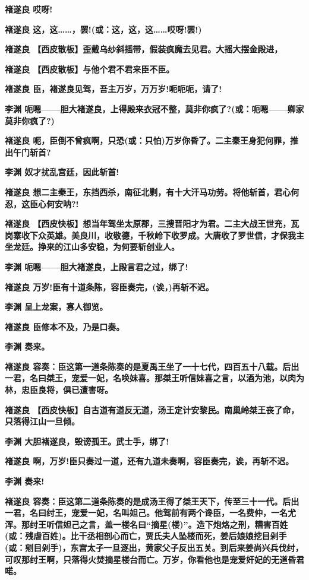 \textbf{褚遂良 哎呀!}

\textbf{褚遂良
这，这\ldots{}\ldots{}，罢!(或：这，这，这\ldots{}\ldots{}哎呀!罢!)}

\textbf{褚遂良
【西皮散板】歪戴乌纱斜插带，假装疯魔去见君。大摇大摆金殿进，}

\textbf{褚遂良 【西皮散板】与他个君不君来臣不臣。}

\textbf{褚遂良 臣，褚遂良见驾，吾主万岁，万万岁!呃呃呃，请了!}

\textbf{李渊
呃嗯------胆大褚遂良，上得殿来衣冠不整，莫非你疯了?(或：呃嗯------卿家莫非你疯了?)}

\textbf{褚遂良
呃，臣倒不曾疯啊，只恐(或：只怕)万岁你昏了。二主秦王身犯何罪，推出午门斩首?}

\textbf{李渊 奴才扰乱宫廷，因此斩首!}

\textbf{褚遂良
想二主秦王，东挡西杀，南征北剿，有十大汗马功劳。将他斩首，君心何忍，这臣心何安呐?!}

\textbf{褚遂良
【西皮快板】想当年驾坐太原郡，三搜晋阳才为君。二主大战王世充，瓦岗寨收下众英雄。美良川，收敬德，千秋岭下收罗成。大唐收了罗世信，才保我主坐龙廷。挣来的江山多安稳，为何要斩创业人。}

\textbf{李渊 呃嗯------胆大褚遂良，上殿言君之过，绑了!}

\textbf{褚遂良 万岁!臣有十道条陈，容臣奏完，(诶，)再斩不迟。}

\textbf{李渊 呈上龙案，寡人御览。}

\textbf{褚遂良 臣修本不及，乃是口奏。}

\textbf{李渊 奏来。}

\textbf{褚遂良
容奏：臣这第一道条陈奏的是夏禹王坐了一十七代，四百五十八载。后出一君，名曰桀王，宠爱一妃，名唤妹喜。那桀王听信妹喜之言，以酒为池，以肉为林，忠臣良将，俱已遭害呀。}

\textbf{褚遂良
【西皮快板】自古道有道反无道，汤王定计安黎民。南巢岭桀王丧了命，只落得江山一旦倾。}

\textbf{李渊 大胆褚遂良，毁谤孤王。武士手，绑了!}

\textbf{褚遂良
啊，万岁!臣只奏过一道，还有九道未奏啊，容臣奏完，诶，再斩不迟。}

\textbf{李渊 奏来!}

\textbf{褚遂良
容奏：臣这第二道条陈奏的是成汤王得了桀王天下，传至三十一代。后出一君，名曰纣王，宠爱一妃，名叫妲己。他驾前有两个谗臣，一名费仲，一名尤浑。那纣王听信妲己之言，盖一楼名曰``摘星(楼)''。造下炮烙之刑，糟害百姓(或：残虐百姓)。比干丞相剖心而亡，贾氏夫人坠楼而死，姜后娘娘挖目剁手(或：剜目剁手)，东宫太子一旦逐出，黄家父子反出五关。到后来姜尚兴兵伐纣，可叹那纣王啊，只落得火焚摘星楼台而亡。万岁，你看他也是宠爱奸妃的无道昏君喏。}

